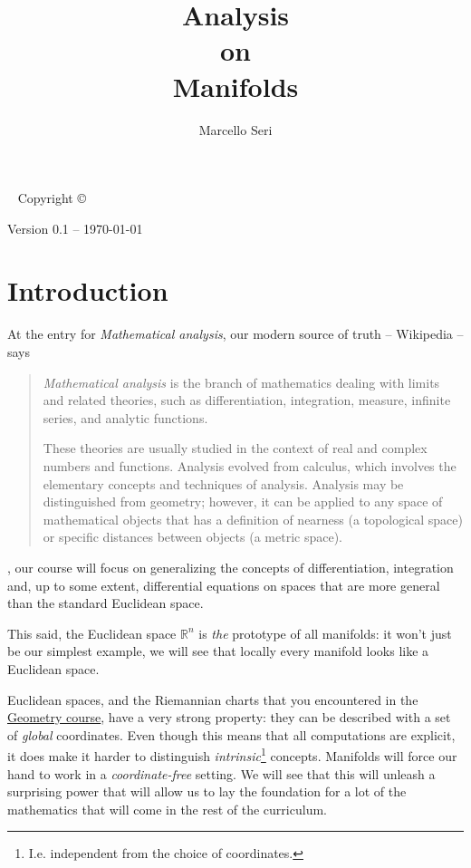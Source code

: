 \documentclass[nobib, a4paper]{tufte-book}
\title{Analysis\\ \noindent
on\\ \noindent
Manifolds
}
\author{Marcello Seri}
\theoremstyle{plain}
\theoremstyle{definition}
\theoremstyle{remark}
\newcommand{\R}{\mathbb{R}}
\begin{document}
\maketitlepage

\newpage

\begin{fullwidth}
    ~\vfill
    \thispagestyle{empty}
    \setlength{\parindent}{0pt}
    \setlength{\parskip}{\baselineskip}
    Copyright \copyright\ \the\year\ \thanklessauthor
    
    \par Version 0.1 -- \today

    \vfill
    \small{\doclicenseThis}
    
\end{fullwidth}
    
\tableofcontents
\cleardoublepage

\chapter*{Introduction}

At the entry for \emph{Mathematical analysis}, our modern source of truth -- Wikipedia -- says

\begin{quotation}
  \emph{Mathematical analysis} is the branch of mathematics dealing with limits and related theories, such as differentiation, integration, measure, infinite series, and analytic functions.

  These theories are usually studied in the context of real and complex numbers and functions. Analysis evolved from calculus, which involves the elementary concepts and techniques of analysis. Analysis may be distinguished from geometry; however, it can be applied to any space of mathematical objects that has a definition of nearness (a topological space) or specific distances between objects (a metric space). 
\end{quotation}

, our course will focus on generalizing the concepts of differentiation, integration and, up to some extent, differential equations on spaces that are more general than the standard Euclidean space.

This said, the Euclidean space $\R^n$ is \emph{the} prototype of all manifolds: it won't just be our simplest example, we will see that locally every manifold looks like a Euclidean space.

Euclidean spaces, and the Riemannian charts that you encountered in the \href{http://www.rolandvdv.nl/G20/}{Geometry course}, have a very strong property: they can be described with a set of \emph{global} coordinates.
Even though this means that all computations are explicit, it does make it harder to distinguish \emph{intrinsic}\footnote{I.e. independent from the choice of coordinates.} concepts.
Manifolds will force our hand to work in a \emph{coordinate-free} setting.
We will see that this will unleash a surprising power that will allow us to lay the foundation for a lot of the mathematics that will come in the rest of the curriculum.
\end{document}
